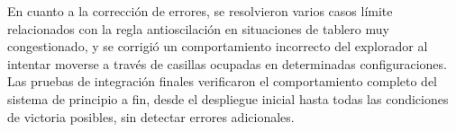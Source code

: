 En cuanto a la corrección de errores, se resolvieron varios casos límite relacionados con la regla antioscilación en situaciones de tablero muy congestionado, y se corrigió un comportamiento incorrecto del explorador al intentar moverse a través de casillas ocupadas en determinadas configuraciones. Las pruebas de integración finales verificaron el comportamiento completo del sistema de principio a fin, desde el despliegue inicial hasta todas las condiciones de victoria posibles, sin detectar errores adicionales.